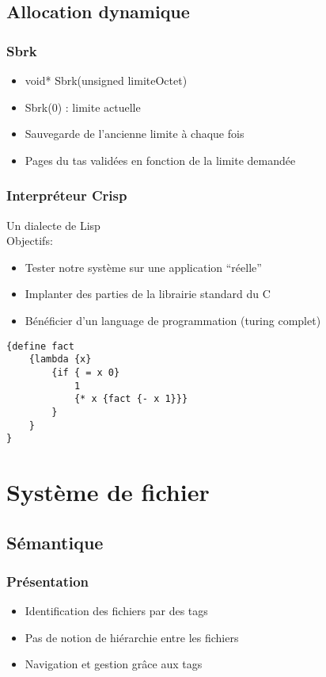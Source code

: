 \documentclass{beamer}
\begin{document}
\subsection{Allocation dynamique}
\begin{frame}
\frametitle{Sbrk}
  \begin{itemize}
  \item void* Sbrk(unsigned limiteOctet)
  \item Sbrk(0) : limite actuelle
  \item Sauvegarde de l'ancienne limite à chaque fois
  \item Pages du tas validées en fonction de la limite demandée
  \end{itemize}
\end{frame}

\begin{frame}[fragile]
  \frametitle{Interpréteur Crisp}
  Un dialecte de Lisp\\
  Objectifs:
  \begin{itemize}
  \item Tester notre système sur une application ``réelle''
  \item Implanter des parties de la librairie standard du C
  \item Bénéficier d'un language de programmation (turing complet)
  \end{itemize}

  {\scriptsize
\begin{verbatim}
{define fact
    {lambda {x}
        {if { = x 0}
            1
            {* x {fact {- x 1}}}
        }
    }
}
\end{verbatim}
}
\end{frame}

\section{Système de fichier}
\subsection{Sémantique}
\begin{frame}
  \frametitle{Présentation}
  \begin{itemize}
  \item Identification des fichiers par des tags
  \item Pas de notion de hiérarchie entre les fichiers
  \item Navigation et gestion grâce aux tags
  \end{itemize}
\end{frame}
\end{document}

